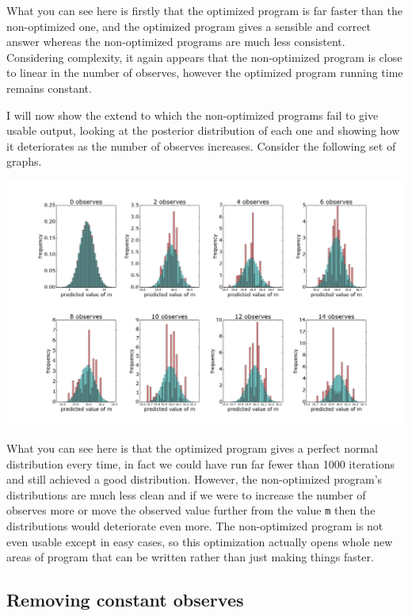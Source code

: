 \documentclass[a4paper]{article}
\begin{document}
What you can see here is firstly that the optimized program is far faster than the non-optimized one, and the optimized program gives a sensible and correct answer whereas the non-optimized programs are much less consistent. Considering complexity, it again appears that the non-optimized program is close to linear in the number of observes, however the optimized program running time remains constant.

I will now show the extend to which the non-optimized programs fail to give usable output, looking at the posterior distribution of each one and showing how it deteriorates as the number of observes increases. Consider the following set of graphs.

\centerline{\includegraphics[width=16cm]{images/removing_observes_2.png}}

What you can see here is that the optimized program gives a perfect normal distribution every time, in fact we could have run far fewer than 1000 iterations and still achieved a good distribution. However, the non-optimized program's distributions are much less clean and if we were to increase the number of observes more or move the observed value further from the value \texttt{m} then the distributions would deteriorate even more. The non-optimized program is not even usable except in easy cases, so this optimization actually opens whole new areas of program that can be written rather than just making things faster.




\subsection{Removing constant observes}
\end{document}
